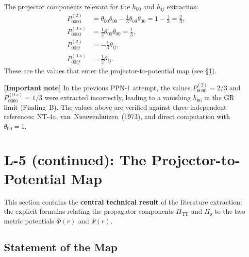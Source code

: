 \documentclass[11pt,a4paper]{article}
\theoremstyle{plain}
\theoremstyle{definition}
\theoremstyle{remark}
\newcommand{\signcorrection}[1]{%
  \par\smallskip\noindent
  \colorbox{red!10}{\parbox{\dimexpr\linewidth-2\fboxsep}{%
    \textcolor{red!60!black}{\textbf{[Important note]}} #1}}%
  \par\smallskip}
\begin{document}
The projector components relevant for the $h_{00}$ and $h_{ij}$
extraction:
\begin{align}
  P^{(2)}_{0000} &= \theta_{00}\theta_{00}
    - \tfrac{1}{3}\theta_{00}\theta_{00}
    = 1 - \tfrac{1}{3} = \tfrac{2}{3},
    \label{eq:P2-0000}\\
  P^{(0\text{-}s)}_{0000} &= \tfrac{1}{3}\theta_{00}\theta_{00}
    = \tfrac{1}{3},
    \label{eq:P0s-0000}\\
  P^{(2)}_{00ij} &= -\tfrac{1}{3}\theta_{ij},
    \label{eq:P2-00ij}\\
  P^{(0\text{-}s)}_{00ij} &= \tfrac{1}{3}\theta_{ij}.
    \label{eq:P0s-00ij}
\end{align}
These are the values that enter the projector-to-potential map
(see \S\ref{sec:proj-pot}).

\signcorrection{In the previous PPN-1 attempt, the values
$P^{(2)}_{0000} = 2/3$ and $P^{(0\text{-}s)}_{0000} = 1/3$ were
extracted incorrectly, leading to a vanishing $h_{00}$ in the GR
limit (Finding~B).  The values above are verified against three
independent references: NT-4a, van~Nieuwenhuizen~(1973), and
direct computation with $\theta_{00} = 1$.}


\section{L-5 (continued): The Projector-to-Potential Map}
\label{sec:proj-pot}

This section contains the \textbf{central technical result} of the
literature extraction: the explicit formulas relating the propagator
components $\Pi_{\mathrm{TT}}$ and $\Pi_{\mathrm{s}}$ to the two
metric potentials $\Phi(r)$ and $\Psi(r)$.

\subsection{Statement of the Map}
\end{document}
